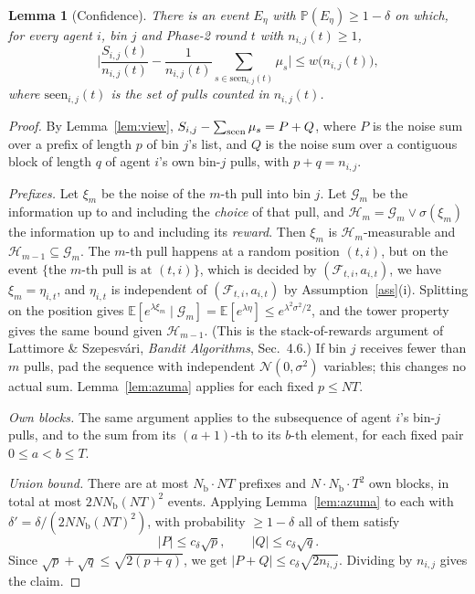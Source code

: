 \documentclass[11pt]{article}
\newtheorem{lemma}[theorem]{Lemma}
\theoremstyle{definition}
\newcommand{\E}{\mathbb{E}}
\newcommand{\Prob}{\mathbb{P}}
\newcommand{\Nb}{N_{\mathrm b}}
\begin{document}
\begin{lemma}[Confidence]\label{lem:conf}
There is an event $E_\eta$ with $\Prob(E_\eta)\ge1-\delta$ on which, for every agent $i$, bin $j$ and Phase-2 round $t$
with $n_{i,j}(t)\ge1$,
\[
\Big|\frac{S_{i,j}(t)}{n_{i,j}(t)}-\frac1{n_{i,j}(t)}\sum_{s\in\mathrm{seen}_{i,j}(t)}\mu_s\Big|\le w\big(n_{i,j}(t)\big),
\]
where $\mathrm{seen}_{i,j}(t)$ is the set of pulls counted in $n_{i,j}(t)$.
\end{lemma}
\begin{proof}
By Lemma~\ref{lem:view}, $S_{i,j}-\sum_{\rm seen}\mu_s=P+Q$, where $P$ is the noise sum over a prefix of length $p$ of
bin $j$'s list, and $Q$ is the noise sum over a contiguous block of length $q$ of agent $i$'s own bin-$j$ pulls, with
$p+q=n_{i,j}$.

\emph{Prefixes.} Let $\xi_m$ be the noise of the $m$-th pull into bin $j$. Let $\mathcal G_m$ be the information up to
and including the \emph{choice} of that pull, and $\mathcal H_m=\mathcal G_m\vee\sigma(\xi_m)$ the information up to and
including its \emph{reward}. Then $\xi_m$ is $\mathcal H_m$-measurable and $\mathcal H_{m-1}\subseteq\mathcal G_m$. The
$m$-th pull happens at a random position $(t,i)$, but on the event $\{\text{the $m$-th pull is at }(t,i)\}$, which is
decided by $(\mathcal F_{t,i},a_{i,t})$, we have $\xi_m=\eta_{i,t}$, and $\eta_{i,t}$ is independent of
$(\mathcal F_{t,i},a_{i,t})$ by Assumption~\ref{ass}(i). Splitting on the position gives
$\E[e^{\lambda\xi_m}\mid\mathcal G_m]=\E[e^{\lambda\eta}]\le e^{\lambda^2\sigma^2/2}$, and the tower property gives the
same bound given $\mathcal H_{m-1}$. (This is the stack-of-rewards argument of Lattimore \& Szepesv\'ari,
\emph{Bandit Algorithms}, Sec.~4.6.) If bin $j$ receives fewer than $m$ pulls, pad the sequence with independent
$\mathcal N(0,\sigma^2)$ variables; this changes no actual sum. Lemma~\ref{lem:azuma} applies for each fixed $p\le NT$.

\emph{Own blocks.} The same argument applies to the subsequence of agent $i$'s bin-$j$ pulls, and to the sum from its
$(a+1)$-th to its $b$-th element, for each fixed pair $0\le a<b\le T$.

\emph{Union bound.} There are at most $\Nb\cdot NT$ prefixes and $N\cdot\Nb\cdot T^2$ own blocks, in total at most
$2N\Nb(NT)^2$ events. Applying Lemma~\ref{lem:azuma} to each with $\delta'=\delta/(2N\Nb(NT)^2)$, with probability
$\ge1-\delta$ all of them satisfy
\[
|P|\le c_\delta\sqrt p,\qquad |Q|\le c_\delta\sqrt q .
\]
Since $\sqrt p+\sqrt q\le\sqrt{2(p+q)}$, we get $|P+Q|\le c_\delta\sqrt{2n_{i,j}}$. Dividing by $n_{i,j}$ gives the claim.
\end{proof}
\end{document}
